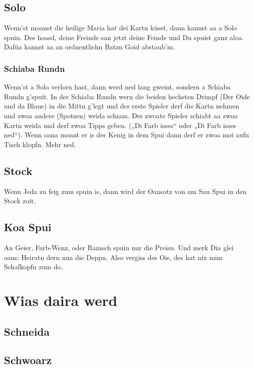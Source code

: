 \documentclass[11pt,a4paper]{scrartcl}		%
\begin{document}
		
		\subsection{Solo}
		Wenn'st moanst die heilige Maria hat dei Kartn küsst, dann kannst aa a Solo spuin. Des hoasd, deine Freinde san jetzt deine Feinde und Du spuist ganz aloa. Dafüa kannst aa an ordnentlichn Batzn Goid abstaub'm.


			\subsubsection{Schiaba Rundn}		
			Wenn'st a Solo verlorn hast, dann werd ned lang gweint, sondern a Schiaba Rundn g'spuit. In der Schiaba Rundn wern die beiden hechsten Drimpf (Der Oide und da Blaue) in die Mittn g'legt und der erste Spieler derf die Kartn nehmen und zwoa andere (Spotzen) weida schiam. Der zwoate Spieler schiabt aa zwoa Kartn weida und derf zwoa Tipps geben. („Di Farb isses“ oder „Di Farb isses ned“). 
			Wenn oana moant er is der Kenig in dem Spui dann derf er zwoa moi aufn Tisch klopfn. Mehr ned.


		\subsection{Stock}
		Wenn Jeda zu feig zum spuin is, dann wird der Oansatz von am Sau Spui in den Stock zoit. 


		\subsection{Koa Spui}
		An Geier, Farb-Wenz, oder Ramsch spuin nur die Preisn. Und merk Dia glei oans: Heiratn dern nua die Deppn. Also vergiss des Ois, des hat nix mim Schafkopfn zum do.  %



	\section{Wias daira werd}

		\subsection{Schneida}


		\subsection{Schwoarz}
\end{document}
